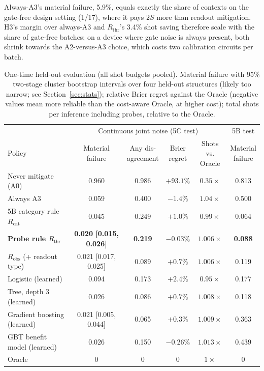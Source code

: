 \documentclass[11pt]{article}
\newcommand{\Rthr}{$R_{\mathrm{thr}}$}
\begin{document}
Always-A3's material failure, 5.9\%, equals exactly the share of contexts on the gate-free design setting (1/17), where it pays $2S$ more than readout mitigation.
H3's margin over always-A3 and \Rthr's 3.4\% shot saving therefore scale with the share of gate-free batches; on a device where gate noise is always present, both shrink towards the A2-versus-A3 choice, which costs two calibration circuits per batch.

\begin{table}[t]
\centering
\caption{One-time held-out evaluation (all shot budgets pooled). Material failure with 95\% two-stage cluster bootstrap intervals over four held-out structures (likely too narrow; see Section~\ref{sec:stats}); relative Brier regret against the Oracle (negative values mean more reliable than the cost-aware Oracle, at higher cost); total shots per inference including probes, relative to the Oracle.}
\label{tab:final}
\footnotesize
\setlength{\tabcolsep}{4pt}
\begin{tabular}{@{}lccccc@{}}
\toprule
& \multicolumn{4}{c}{Continuous joint noise (5C test)} & 5B test \\
\cmidrule(lr){2-5}\cmidrule(l){6-6}
Policy & \shortstack{Material\\failure} & \shortstack{Any dis-\\agreement} & \shortstack{Brier\\regret} & \shortstack{Shots vs.\\Oracle} & \shortstack{Material\\failure} \\
\midrule
Never mitigate (A0) & 0.960 & 0.986 & $+93.1\%$ & $0.35\times$ & 0.813 \\
Always A3 & 0.059 & 0.400 & $-1.4\%$ & $1.04\times$ & 0.500 \\
5B category rule $R_{\mathrm{cat}}$ & 0.045 & 0.249 & $+1.0\%$ & $0.99\times$ & 0.064 \\
\textbf{Probe rule \Rthr} & \textbf{0.020 [0.015, 0.026]} & \textbf{0.219} & $\mathbf{-0.03\%}$ & $\mathbf{1.006\times}$ & \textbf{0.088} \\
$R_{\mathrm{obs}}$ (+ readout type) & 0.021 [0.017, 0.025] & 0.089 & $+0.7\%$ & $1.006\times$ & 0.119 \\
Logistic (learned) & 0.094 & 0.173 & $+2.4\%$ & $0.95\times$ & 0.177 \\
Tree, depth 3 (learned) & 0.026 & 0.086 & $+0.7\%$ & $1.008\times$ & 0.118 \\
Gradient boosting (learned) & 0.021 [0.005, 0.044] & 0.065 & $+0.3\%$ & $1.009\times$ & 0.363 \\
GBT benefit model (learned) & 0.026 & 0.150 & $-0.26\%$ & $1.013\times$ & 0.439 \\
Oracle & 0 & 0 & 0 & $1\times$ & 0 \\
\bottomrule
\end{tabular}
\end{table}
\end{document}
